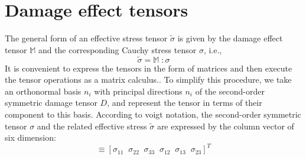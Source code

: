 \documentclass[a4paper,12pt,twoside]{report}
\begin{document}
\section{Damage effect tensors}\label{Matrix Representation of Damage effect tensors}
\indent\indent\indent The general form of an effective stress tensor $\tilde{\sigma}$ is given by the damage effect tensor $\mathbb{M}$ and the corresponding Cauchy stress tensor $\sigma$, i.e.,
\begin{equation}
\tilde{\sigma}  = \mathbb{M} \; :  \sigma 
\label{eqn:effective_stress_tensor} 
\end{equation}
It is convenient to express the tensors in the form of matrices and then execute the tensor operations as a matrix calculus.. To simplify this procedure, we take an orthonormal basis ${n_{i}}$ with principal directions $n_{i}$ of the second-order symmetric damage tensor $D$, and represent the tensor in terms of their component to this basis. According to voigt notation, the second-order symmetric tensor $\sigma$ and the related effective stress $\tilde{\sigma}$ are expressed by the column vector of six dimension:
\begin{equation}
   [\sigma_{P}]  \equiv  [\sigma_{11} \;\; \sigma_{22} \;\;\sigma_{33} \;\;\sigma_{12} \;\;\sigma_{13} \;\;\sigma_{23} ]^{T}
\end{equation}
\end{document}
